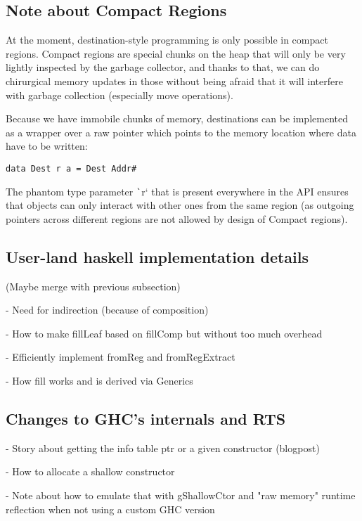\documentclass[english]{jflart}
\begin{document}
\subsection{Note about Compact Regions}

At the moment, destination-style programming is only possible in compact regions. Compact regions are special chunks on the heap that will only be very lightly inspected by the garbage collector, and thanks to that, we can do chirurgical memory updates in those without being afraid that it will interfere with garbage collection (especially move operations).

Because we have immobile chunks of memory, destinations can be implemented as a wrapper over a raw pointer which points to the memory location where data have to be written:

\begin{verbatim}
data Dest r a = Dest Addr#
\end{verbatim}

The phantom type parameter \texttt`r` that is present everywhere in the API ensures that objects can only interact with other ones from the same region (as outgoing pointers across different regions are not allowed by design of Compact regions).

\subsection{User-land haskell implementation details}
 
(Maybe merge with previous subsection)

- Need for indirection (because of composition)

- How to make fillLeaf based on fillComp but without too much overhead

- Efficiently implement fromReg and fromRegExtract

- How fill works and is derived via Generics

\subsection{Changes to GHC's internals and RTS}

- Story about getting the info table ptr or a given constructor (blogpost)

- How to allocate a shallow constructor

- Note about how to emulate that with gShallowCtor and "raw memory" runtime reflection when not using a custom GHC version
\end{document}
